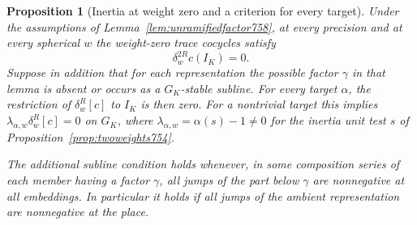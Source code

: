 \documentclass[a4paper,11pt]{article}
\newtheorem{proposition}{Proposition}[section]
\theoremstyle{definition}
\theoremstyle{remark}
\numberwithin{equation}{section}
\begin{document}
\begin{proposition}[Inertia at weight zero and a criterion for every target]
\leavevmode\label{prop:unramifiedsplit758}
Under the assumptions of Lemma~\ref{lem:unramifiedfactor758},
at every precision and at every spherical \(w\) the weight-zero
trace cocycles satisfy
\[
                        \delta_w^{2R}c(I_K)=0 .
\]
Suppose in addition that for each representation the possible
factor \(\gamma\) in that lemma is absent or occurs as a
\(G_K\)-stable subline. For every target \(\alpha\), the
restriction of \(\delta_w^R[c]\) to \(I_K\) is then zero.
For a nontrivial target this implies
\(\lambda_{\alpha,w}\delta_w^R[c]=0\) on \(G_K\), where
\(\lambda_{\alpha,w}=\alpha(s)-1\ne0\) for the inertia unit
test \(s\) of Proposition~\ref{prop:twoweights754}.

The additional subline condition holds whenever, in some
composition series of each member having a factor \(\gamma\),
all jumps of the part below \(\gamma\) are nonnegative at all
embeddings. In particular it holds if all jumps of the ambient
representation are nonnegative at the place.
\end{proposition}
\end{document}

